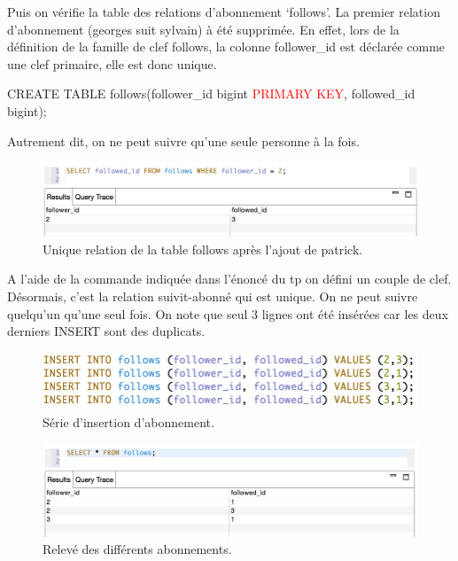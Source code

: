 Puis on vérifie la table des relations d'abonnement \lq follows\rq.
La premier relation d'abonnement (georges suit sylvain) à été supprimée.
En effet, lors de la définition de la famille de clef follows, la colonne
follower\_id est déclarée comme une clef primaire, elle est donc unique.\newline
\begin{tt}
CREATE TABLE follows(follower\_id bigint \textcolor{red}{PRIMARY KEY}, followed\_id bigint); \newline
\end{tt}
Autrement dit, on ne peut suivre qu'une seule personne à la fois.
\begin{figure}[h!]
\centering
\includegraphics[scale=0.6]{img/solo_key.png}
\caption{Unique relation de la table follows après l'ajout de patrick.}
\end{figure}
\par A l'aide de la commande indiquée dans l'énoncé du tp on défini un couple de clef.
Désormais, c'est la relation suivit-abonné qui est unique. On ne peut suivre quelqu'un 
qu'une seul fois. On note que seul 3 lignes ont été insérées car les deux derniers INSERT
sont des duplicats.
\begin{figure}[h!]
\centering
\includegraphics[scale=0.7]{img/all_follows.png}
\caption{Série d'insertion d'abonnement.}
\end{figure}

\begin{figure}[h!]
\centering
\includegraphics[scale=0.6]{img/follows_result.png}
\caption{Relevé des différents abonnements.}
\end{figure}

